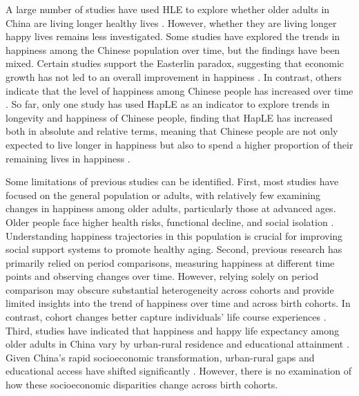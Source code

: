 \documentclass[12pt, a4paper]{article}
\begin{document}
A large number of studies have used HLE to explore whether older adults in China are living longer healthy lives \autocite{jiao.2019.inequality,liu.2019.are,zhang.2022.trends}. However, whether they are living longer happy lives remains less investigated. Some studies have explored the trends in happiness among the Chinese population over time, but the findings have been mixed. Certain studies support the Easterlin paradox, suggesting that economic growth has not led to an overall improvement in happiness \autocite{easterlin.2012.chinas,easterlin.2021.growth,li.2014.time}. In contrast, others indicate that the level of happiness among Chinese people has increased over time \autocite{cai.2023.does,wu.2017.income}. So far, only one study has used HapLE as an indicator to explore trends in longevity and happiness of Chinese people, finding that HapLE has increased both in absolute and relative terms, meaning that Chinese people are not only expected to live longer in happiness but also to spend a higher proportion of their remaining lives in happiness \autocite{duan.2020.happy}.

Some limitations of previous studies can be identified. First, most studies have focused on the general population or adults, with relatively few examining changes in happiness among older adults, particularly those at advanced ages. Older people face higher health risks, functional decline, and social isolation \autocite{liu.2019.are}. Understanding happiness trajectories in this population is crucial for improving social support systems to promote healthy aging. Second, previous research has primarily relied on period comparisons, measuring happiness at different time points and observing changes over time. However, relying solely on period comparison may obscure substantial heterogeneity across cohorts and provide limited insights into the trend of happiness over time and across birth cohorts. In contrast, cohort changes better capture individuals' life course experiences \autocite{payne.2022.expansion}. Third, studies have indicated that happiness and happy life expectancy among older adults in China vary by urban-rural residence and educational attainment \autocite{cheng.2021.sociodemographic,wan.2024.socioeconomic}. Given China's rapid socioeconomic transformation, urban-rural gaps and educational access have shifted significantly \autocite{wang.2020.gap}. However, there is no examination of how these socioeconomic disparities change across birth cohorts.
\end{document}

